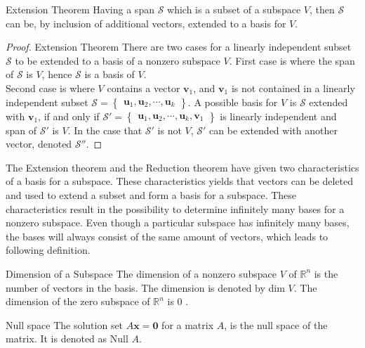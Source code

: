 \begin{theorem}{Extension Theorem}
Having a span $\mathcal{S}$ which is a subset of a subspace $V$, then $\mathcal{S}$ can be, by inclusion of additional vectors, extended to a basis for $V$. \cite[245]{LiAl}
\end{theorem}

\begin{proof}{Extension Theorem}
There are two cases for a linearly independent subset $\mathcal{S}$ to be extended to a basis of a nonzero subspace $V$.
First case is where the span of $\mathcal{S}$ is $V$, hence $\mathcal{S}$ is a basis of $V$.\\
Second case is where $V$ contains a vector $\textbf{v}_1$, and $\textbf{v}_1$ is not contained in a linearly independent subset $\mathcal{S}=
\begin{Bmatrix} \textbf{u}_1,\textbf{u}_2,\cdots,\textbf{u}_k \end{Bmatrix} 
 $. A possible basis for $V$ is $\mathcal{S}$ extended with $\textbf{v}_1$, if and only if $\mathcal{S'}=\begin{Bmatrix} \textbf{u}_1,\textbf{u}_2,\cdots,\textbf{u}_k, \textbf{v}_1 \end{Bmatrix}$ is linearly independent and span of $\mathcal{S'}$ is $V$. In the case that $\mathcal{S'}$ is not $V$, $\mathcal{S'}$ can be extended with another vector, denoted $\mathcal{S''}$. \qedsymbol 
\end{proof}

The Extension theorem and the Reduction theorem have given two characteristics of a basis for a subspace. These characteristics yields that vectors can be deleted and used to extend a subset and form a basis for a subspace. These characteristics result in the possibility to determine infinitely many bases for a nonzero subspace. Even though a particular subspace has infinitely many bases, the bases will always consist of the same amount of vectors, which leads to following definition.

\begin{definition}{Dimension of a Subspace}
The dimension of a nonzero subspace $V$ of $\mathbb{R}^n$ is the number of vectors in the basis. The dimension is denoted by dim $V$. The dimension of the zero subspace of $\mathbb{R}^n$ is 0 \cite[246]{LiAl}.
\end{definition}

\begin{definition}{Null space}
The solution set $A\textbf{x}=\textbf{0}$ for a matrix $A$, is the null space of the matrix. It is denoted as Null $A$. \cite[232]{LiAl}
\end{definition}

